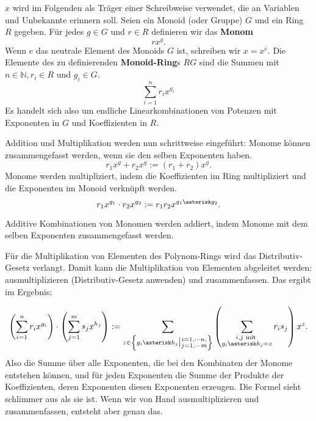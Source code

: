 \documentclass[a4paper]{amsart}
\theoremstyle{definition}
\newcommand{\N}{\ensuremath{\mathbb{ N }}}
\begin{document}
$x$ wird im Folgenden als Träger einer Schreibweise verwendet, die an Variablen und Unbekannte erinnern soll. Seien ein Monoid (oder Gruppe) $G$ und ein Ring $R$ gegeben. Für jedes $g \in G$ und $r \in R$ definieren wir das \textbf{Monom}
\begin{equation}
   rx^g.
\end{equation}
Wenn $e$ das neutrale Element des Monoids $G$ ist, schreiben wir $x = x^e$.
Die Elemente des zu definierenden \textbf{Monoid-Ring}s $RG$ sind die Summen mit $n \in \N, r_i \in R$ und $g_i \in G$.
\begin{equation}\label{polynomRingElement}
   \sum_{i=1}^n r_i x^{g_i}
\end{equation}
Es handelt sich also um endliche Linearkombinationen von Potenzen mit Exponenten in $G$ und Koeffizienten in $R$.

Addition und Multiplikation werden nun schrittweise eingeführt: Monome können zusammengefasst werden, wenn sie den selben Exponenten haben.
\begin{equation}\label{AdditionMonom}
   r_1x^g + r_2x^g := (r_1 + r_2)x^g.
\end{equation}
Monome werden multipliziert, indem die Koeffizienten im Ring multipliziert und die Exponenten im Monoid verknüpft werden.
\begin{equation}\label{MultiplikationMonom}
   r_1x^{g_1} \cdot r_2x^{g_2} := r_1r_2x^{g_1\asterisk g_2}.
\end{equation}

Additive Kombinationen von Monomen werden addiert, indem Monome mit dem selben Exponenten zusammengefasst werden.

Für die Multiplikation von Elementen des Polynom-Rings wird das Distributiv-Gesetz verlangt. Damit kann die Multiplikation von Elementen abgeleitet werden: ausmultiplizieren (Distributiv-Gesetz anwenden) und zusammenfassen. Das ergibt im Ergebnis:

\begin{equation}\label{MultiplikationPolynom}
   \left(\sum_{i=1}^n r_i x^{g_i}\right) \cdot \left(\sum_{j=1}^m s_j x^{h_j}\right) :=
   \sum_{z \in \left\{g_i \asterisk h_j \big| \substack{i = 1, \cdots n, \\j = 1, \cdots m} \right\} } 
   \left( \sum_{\substack{i,j \text{ mit } \\g_i \asterisk h_j = z}} r_i s_j \right) x^z.
\end{equation} 
Also die Summe über alle Exponenten, die bei den Kombinaten der Monome entstehen können, und für jeden Exponenten die Summe der Produkte der Koeffizienten, deren Exponenten diesen Exponenten erzeugen.
Die Formel sieht schlimmer aus als sie ist. Wenn wir von Hand ausmultiplizieren und zusammenfassen, entsteht aber genau das.
\end{document}

